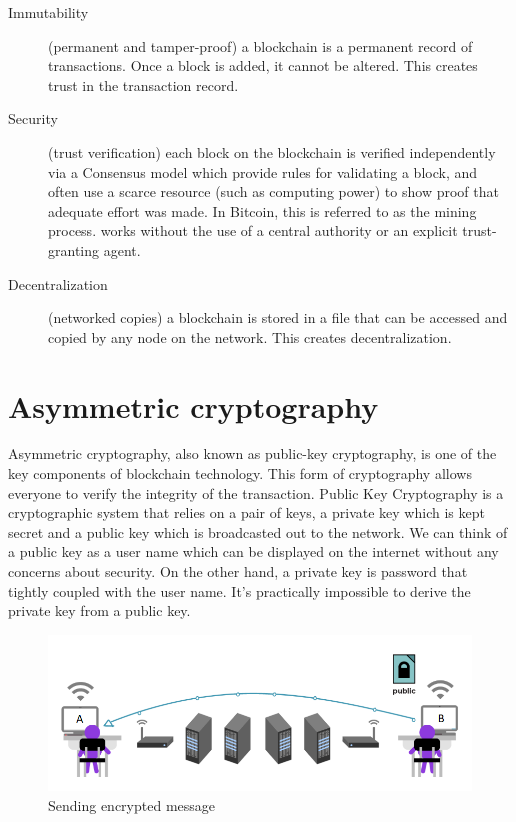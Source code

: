\begin{description}
\item[Immutability] (permanent and tamper-proof)  a blockchain is a permanent record of  transactions. Once a block is added, it cannot be altered.  This creates trust in the transaction record.
\item[Security] (trust verification) each block on the blockchain is verified independently via a Consensus model which provide rules for validating a block, and often use a scarce resource (such as computing power) to show proof that adequate effort was made.  In Bitcoin, this is referred to as the mining process.  works without the use of a central authority or an explicit trust-granting agent.
\item[Decentralization] (networked copies) a blockchain is stored in a file that can be accessed and copied by any node on the network.  This creates decentralization.
\end{description}

\section{Asymmetric cryptography}

Asymmetric cryptography, also known as public-key cryptography, is one of the key components of blockchain technology. This form of cryptography allows everyone to verify the integrity of the transaction. Public Key Cryptography is a cryptographic system that relies on a pair of keys, a private key which is kept secret and a public key which is broadcasted out to the network. We can think of a public key as a user name which can be displayed on the internet without any concerns about security. On the other hand, a private key is password that tightly coupled with the user name. It's practically impossible to derive the private key from a public key. 



\begin{figure}[H]
    \begin{center}
        \begin{minipage}{\linewidth}
            \begin{center}
                \includegraphics[width=\textwidth,keepaspectratio]{img/asymetric1.png}
                \caption{Sending encrypted message \cite{SSD.EFF.ORG}}
                \label{obr 1.2.1}
            \end{center}
        \end{minipage}
    \end{center}
\end{figure}

